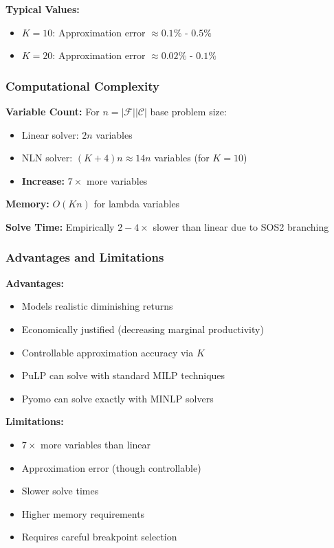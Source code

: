 \documentclass[11pt,a4paper]{article}
\begin{document}
\textbf{Typical Values:}
\begin{itemize}
    \item $K = 10$: Approximation error $\approx 0.1\%$ - $0.5\%$
    \item $K = 20$: Approximation error $\approx 0.02\%$ - $0.1\%$
\end{itemize}

\subsubsection{Computational Complexity}

\textbf{Variable Count:} For $n = |\mathcal{F}||\mathcal{C}|$ base problem size:
\begin{itemize}
    \item Linear solver: $2n$ variables
    \item NLN solver: $(K+4)n \approx 14n$ variables (for $K=10$)
    \item \textbf{Increase:} $7\times$ more variables
\end{itemize}

\textbf{Memory:} $O(Kn)$ for lambda variables

\textbf{Solve Time:} Empirically $2-4\times$ slower than linear due to SOS2 branching

\subsubsection{Advantages and Limitations}

\textbf{Advantages:}
\begin{itemize}
    \item Models realistic diminishing returns
    \item Economically justified (decreasing marginal productivity)
    \item Controllable approximation accuracy via $K$
    \item PuLP can solve with standard MILP techniques
    \item Pyomo can solve exactly with MINLP solvers
\end{itemize}

\textbf{Limitations:}
\begin{itemize}
    \item $7\times$ more variables than linear
    \item Approximation error (though controllable)
    \item Slower solve times
    \item Higher memory requirements
    \item Requires careful breakpoint selection
\end{itemize}
\end{document}
